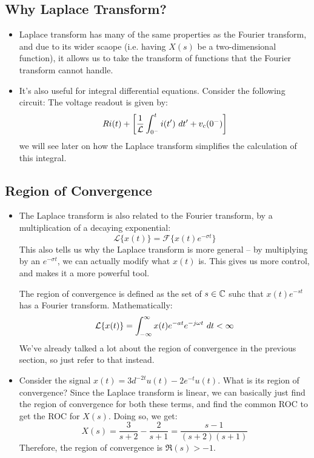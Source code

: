 \subsection{Why Laplace Transform?}
\begin{itemize}
	\item Laplace transform has many of the same properties as the Fourier transform, and due to its 
		wider scaope (i.e. having \( X(s) \) be a two-dimensional function), it allows us to take the transform of 
		functions that the Fourier transform cannot handle. 
	\item It's also useful for integral differential equations. Consider the following circuit:
		The voltage readout is given by:
		\[
		Ri(t) + \left[ \frac{1}{\mathcal L }\int_{0^{-}}^{t} i(t') \ d t' + v_c(0^{-})  \right] 
		\] 
		we will see later on how the Laplace transform simplifies the calculation of this integral.  
\end{itemize}

\subsection{Region of Convergence}
\begin{itemize}
	\item The Laplace transform is also related to the Fourier transform, by a multiplication of a 
		decaying exponential:
		\[
		\mathcal L \{x(t)\}  = \mathcal F \{x(t) e^{-\sigma t}\} 
		\] 
		This also tells us why the Laplace transform is more general -- by multiplying by an 
		\( e^{-\sigma t} \), we can actually modify what \( x(t) \) is. This gives us more control, and makes 
		it a more powerful tool. 
		
		The region of convergence is defined as the set of \( s \in \mathbb C \) suhc that 
		\( x(t) e^{-st} \) has a Fourier transform. Mathematically:
		\[
		\mathcal L \{x(t) \}  = \int_{-\infty}^{\infty} x(t) e^{-at} e^{- j \omega t}\ d t  < \infty
		\] 
		We've already talked a lot about the region of convergence in the previous section, so just refer to that 
		instead. 
	\item Consider the signal \( x(t) = 3d^{-2t}u(t) - 2e^{-t}u(t) \). What is its region of convergence? Since the 
		Laplace transform is linear, we can basically just find the region of convergence for both these 
		terms, and find the common ROC to get the ROC for \( X(s) \). Doing so, we get:
		\[
		X(s) = \frac{3}{s + 2} - \frac{2}{s + 1} = \frac{s - 1}{(s + 2)(s + 1)}
		\] 
		Therefore, the region of convergence is \( \Re(s) > -1 \). 
\end{itemize}

